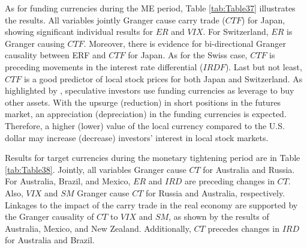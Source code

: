 \documentclass[a4paper, twoside]{templates/ociamthesis}
\begin{document}
As for funding currencies during the ME period, Table \ref{tab:Table37} illustrates the results. All variables jointly Granger cause carry trade (\(CTF\)) for Japan, showing significant individual results for \(ER\) and \(VIX\). For Switzerland, \(ER\) is Granger causing \(CTF\). Moreover, there is evidence for bi-directional Granger causality between ERF and \(CTF\) for Japan. As for the Swiss case, \(CTF\) is preceding movements in the interest rate differential (\(IRDF\)). Last but not least, \(CTF\) is a good predictor of local stock prices for both Japan and Switzerland. As highlighted by \textcite{nishigaki2007}, speculative investors use funding currencies as leverage to buy other assets. With the upsurge (reduction) in short positions in the futures market, an appreciation (depreciation) in the funding currencies is expected. Therefore, a higher (lower) value of the local currency compared to the U.S. dollar may increase (decrease) investors' interest in local stock markets.

\begin{table}[H]

\caption{\label{tab:Table37}Granger causality tests for funding currencies, ME period}
\centering
{}
\end{table}

Results for target currencies during the monetary tightening period are in Table \ref{tab:Table38}. Jointly, all variables Granger cause \(CT\) for Australia and Russia. For Australia, Brazil, and Mexico, \(ER\) and \(IRD\) are preceding changes in \(CT\). Also, \(VIX\) and \(SM\) Granger cause \(CT\) for Russia and Australia, respectively. Linkages to the impact of the carry trade in the real economy are supported by the Granger causality of \(CT\) to \(VIX\) and \(SM\), as shown by the results of Australia, Mexico, and New Zealand. Additionally, \(CT\) precedes changes in \(IRD\) for Australia and Brazil.
\end{document}

